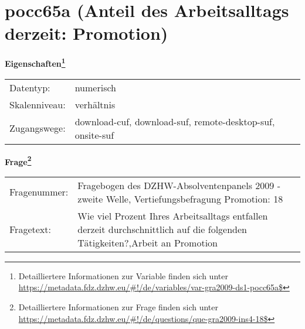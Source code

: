 
    \setcounter{footnote}{0}

    \vspace*{-1.8cm}
	\section{pocc65a (Anteil des Arbeitsalltags derzeit: Promotion)}
	\label{section:pocc65a}



    \vspace*{0.5cm}
    \noindent\textbf{Eigenschaften\footnote{Detailliertere Informationen zur Variable finden sich unter
		\url{https://metadata.fdz.dzhw.eu/\#!/de/variables/var-gra2009-ds1-pocc65a$}}}\\
	\begin{tabularx}{\hsize}{@{}lX}
	Datentyp: & numerisch \\
	Skalenniveau: & verhältnis \\
	Zugangswege: &
	  download-cuf, 
	  download-suf, 
	  remote-desktop-suf, 
	  onsite-suf
 \\
    \end{tabularx}



				\vspace*{0.5cm}
                \noindent\textbf{Frage\footnote{Detailliertere Informationen zur Frage finden sich unter
		              \url{https://metadata.fdz.dzhw.eu/\#!/de/questions/que-gra2009-ins4-18$}}}\\
				\begin{tabularx}{\hsize}{@{}lX}
					Fragenummer: &
					  Fragebogen des DZHW-Absolventenpanels 2009 - zweite Welle, Vertiefungsbefragung Promotion:
					  18
 \\
					Fragetext: & Wie viel Prozent Ihres Arbeitsalltags entfallen derzeit durchschnittlich auf die folgenden Tätigkeiten?,Arbeit an Promotion \\
				\end{tabularx}





